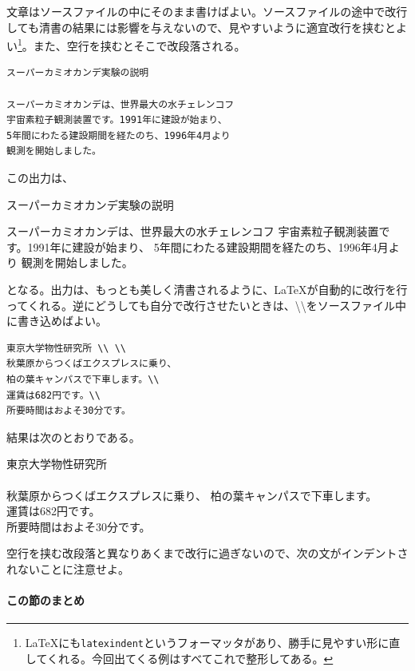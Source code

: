文章はソースファイルの中にそのまま書けばよい。ソースファイルの途中で改行しても清書の結果には影響を与えないので、見やすいように適宜改行を挟むとよい\footnote{\LaTeX にも\texttt{latexindent}というフォーマッタがあり、勝手に見やすい形に直してくれる。今回出てくる例はすべてこれで整形してある。}。また、空行を挟むとそこで改段落される。
\begin{reidai}
    \begin{verbatim}
スーパーカミオカンデ実験の説明

スーパーカミオカンデは、世界最大の水チェレンコフ
宇宙素粒子観測装置です。1991年に建設が始まり、
5年間にわたる建設期間を経たのち、1996年4月より
観測を開始しました。
\end{verbatim}
\end{reidai} \noindent
この出力は、
\begin{kekka}
    スーパーカミオカンデ実験の説明

    スーパーカミオカンデは、世界最大の水チェレンコフ
    宇宙素粒子観測装置です。1991年に建設が始まり、
    5年間にわたる建設期間を経たのち、1996年4月より
    観測を開始しました。
\end{kekka} \noindent
となる。出力は、もっとも美しく清書されるように、\LaTeX が自動的に改行を行ってくれる。逆にどうしても自分で改行させたいときは、\textbackslash \textbackslash をソースファイル中に書き込めばよい。
\begin{reidai}
    \begin{verbatim}
東京大学物性研究所 \\ \\
秋葉原からつくばエクスプレスに乗り、
柏の葉キャンパスで下車します。\\
運賃は682円です。\\
所要時間はおよそ30分です。
\end{verbatim}
\end{reidai} \noindent
結果は次のとおりである。
\begin{kekka}
    東京大学物性研究所 \\ \\
    秋葉原からつくばエクスプレスに乗り、
    柏の葉キャンパスで下車します。\\
    運賃は682円です。\\
    所要時間はおよそ30分です。
\end{kekka}

空行を挟む改段落と異なりあくまで改行に過ぎないので、次の文がインデントされないことに注意せよ。

\paragraph{この節のまとめ}


